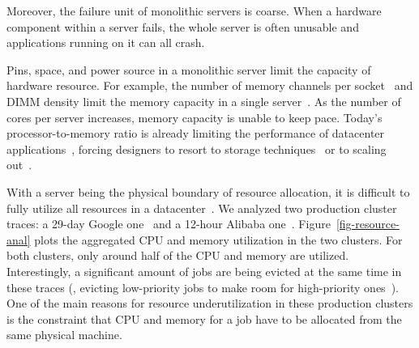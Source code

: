 \documentclass[10pt,times,twocolumn]{z2-article}
\begin{document}
Moreover, the failure unit of monolithic servers is coarse.
When a hardware component within a server fails, %
the whole server is often unusable and applications running on it can all crash.

Pins, space, and power source in a monolithic server limit the capacity of hardware resource.
For example, the number of memory channels per socket~\cite{ITRS14} and DIMM density 
limit the memory capacity in a single server~\cite{HP-MemoryEvol,MemoryWall95,MemoryCube-ISCA17,Lim09-disaggregate}. 
As the number of cores per server increases, memory capacity is unable to keep pace.
Today's processor-to-memory ratio is already limiting the performance of datacenter applications~\cite{Ongaro11-RamCloud,page-graph}, 
forcing designers to resort to storage techniques~\cite{Zhang-FAST15-FlashGraph} 
or to scaling out~\cite{GU17-NSDI,Dragojevic14-FaRM,Dragojevic15-FaRM,Gonzalez12-OSDI}.


With a server being the physical boundary of resource allocation, 
it is difficult to fully utilize all resources in a datacenter~\cite{Barroso-COMPUTER,Quasar-ASPLOS,PowerNap}.
We analyzed two production cluster traces: a 29-day Google one~\cite{GoogleTrace}
and a 12-hour Alibaba one~\cite{AliTrace}.
Figure~\ref{fig-resource-anal} plots the aggregated CPU and memory utilization in the two clusters.
For both clusters, only around half of the CPU and memory are utilized.
Interestingly, %
a significant amount of jobs are being evicted at the same time in these traces
(\eg, evicting low-priority jobs to make room for high-priority ones~\cite{Borg}). %
One of the main reasons for resource underutilization in these production clusters is 
the constraint that CPU and memory for a job have to be allocated from 
the same physical machine.
\end{document}
